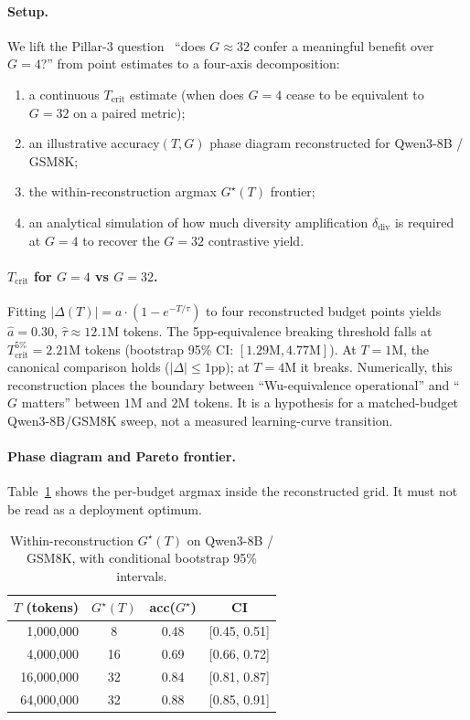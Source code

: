 \documentclass{article}
\begin{document}
\paragraph{Setup.}
We lift the Pillar-3 question~\cite{tan2025scalingrl} ``does $G\!\approx\!32$ confer a meaningful
benefit over $G\!=\!4$?'' from point estimates to a four-axis decomposition:
\begin{enumerate}\itemsep1pt
\item a continuous $T_\text{crit}$ estimate (when does $G\!=\!4$ cease to be
      equivalent to $G\!=\!32$ on a paired metric);
\item an illustrative accuracy$(T, G)$ phase diagram reconstructed for
      Qwen3-8B / GSM8K;
\item the within-reconstruction argmax $G^\star(T)$ frontier;
\item an analytical simulation of how much diversity amplification
      $\delta_\text{div}$ is required at $G\!=\!4$ to recover the
      $G\!=\!32$ contrastive yield.
\end{enumerate}

\paragraph{$T_\text{crit}$ for $G=4$ vs $G=32$.}
Fitting $|\Delta(T)| = a \cdot (1 - e^{-T/\tau})$ to four reconstructed
budget points
yields $\hat a=0.30$, $\hat\tau \!\approx\! 12.1$M tokens.
The 5pp-equivalence breaking threshold falls at
$T_\text{crit}^{5\%}\!=\!2.21$M tokens
(bootstrap 95\% CI: $[1.29\text{M}, 4.77\text{M}]$).  At $T\!=\!1$M, the
canonical comparison holds ($|\Delta|\!\le\!1$pp); at $T\!=\!4$M it breaks.
Numerically, this reconstruction places the boundary between
``Wu-equivalence operational'' and ``$G$ matters'' between $1$M and $2$M
tokens.  It is a hypothesis for a matched-budget Qwen3-8B/GSM8K sweep, not a
measured learning-curve transition.

\paragraph{Phase diagram and Pareto frontier.}
Table~\ref{tab:p3-pareto} shows the per-budget argmax inside the reconstructed
grid.  It must not be read as a deployment optimum.

\begin{table}[h!]
\centering
\caption{Within-reconstruction $G^\star(T)$ on Qwen3-8B / GSM8K, with
conditional bootstrap 95\% intervals.}
\label{tab:p3-pareto}
\small
\begin{tabular}{rccc}
\hline
$T$ (tokens) & $G^\star(T)$ & acc($G^\star$) & CI \\ \hline
  1,000,000 &   8 & 0.48 & [0.45, 0.51] \\
  4,000,000 &  16 & 0.69 & [0.66, 0.72] \\
 16,000,000 &  32 & 0.84 & [0.81, 0.87] \\
 64,000,000 &  32 & 0.88 & [0.85, 0.91] \\ \hline
\end{tabular}
\end{table}
\end{document}
